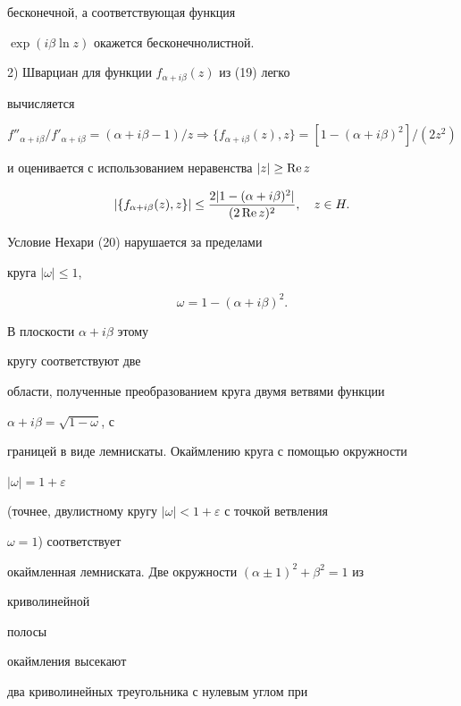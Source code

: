 бесконечной, а соответствующая функция 


$\exp(i\beta\ln z)$ окажется бесконечнолистной. 


 


2) Шварциан для функции $f_{\alpha+i\beta}(z)$ из (19) легко 


вычисляется


$$ 


f''_{\alpha+i\beta}/f'_{\alpha+i\beta}=(\alpha+i\beta-1)/z 


\Longrightarrow\{f_{\alpha+i\beta}(z),z\}= 


[1-(\alpha+i\beta)^2]/(2z^2) 


$$ 


и оценивается с использованием неравенства $|z|\ge\operatorname{Re} z$ 


$$ 


|\{f_{\alpha+i\beta}(z),z\}|\le 


\frac{2|1-(\alpha+i\beta)^2|}{(2\re z)^2},\quad z\in H. 


$$ 


Условие Нехари (20) нарушается за пределами 


круга $|\omega|\le 1$, 


\begin{equation} 


\omega=1-(\alpha+i\beta)^2. 


\end{equation} 


В плоскости $\alpha+i\beta$ этому 


кругу соответствуют две 


области, полученные преобразованием круга двумя ветвями функции 


$\alpha+i\beta=\sqrt{1-\omega}$, с 


границей в виде лемнискаты. Окаймлению круга с помощью окружности 


$|\omega|=1+\varepsilon$ 


(точнее, двулистному кругу $|\omega|<1+\varepsilon$ с точкой ветвления 


$\omega=1$) соответствует 


окаймленная лемниската. Две окружности $(\alpha\pm 1)^2+\beta^2=1$ из 


криволинейной 


полосы 


окаймления высекают 


два криволинейных треугольника с нулевым углом при 


